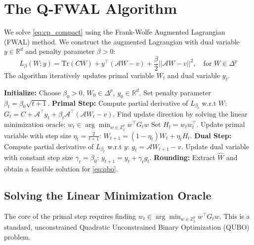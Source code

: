 \documentclass{article}
\begin{document}
\section{The Q-FWAL Algorithm}

We solve \eqref{eq:cp_compact} using the Frank-Wolfe Augmented Lagrangian (FWAL) method. We construct the augmented Lagrangian with dual variable $y \in \mathbb{R}^d$ and penalty parameter $\beta > 0$:
\begin{equation}
L_\beta(W; y) = \text{Tr}(CW) + y^\top (\mathcal{A}W - v) + \frac{\beta}{2} ||\mathcal{A}W - v||^2, \quad \text{for } W \in \Delta^p \label{eq:aug_lag}
\end{equation}
The algorithm iteratively updates primal variable $W_t$ and dual variable $y_t$.

\begin{algorithm}
\caption{Q-FWAL for Constrained QBO}
\begin{algorithmic}[1]
\State \textbf{Initialize:} Choose $\beta_0 > 0$, $W_0 \in \Delta^p$, $y_0 \in \mathbb{R}^d$.
    \State Set penalty parameter $\beta_t = \beta_0 \sqrt{t+1}$.
    \State \textbf{Primal Step:} Compute partial derivative of $L_{\beta_t}$ w.r.t $W$:
    \State \quad $G_t = C + \mathcal{A}^\top y_t + \beta_t \mathcal{A}^\top (\mathcal{A} W_t - v)$.
    \State \quad Find update direction by solving the linear minimization oracle:
    \State \quad \quad $w_t \in \arg\min_{w \in \mathbb{Z}_2^p} w^\top G_t w$
    \State \quad Set $H_t = w_t w_t^\top$.
    \State \quad Update primal variable with step size $\eta_t = \frac{2}{t+1}$:
    \State \quad \quad $W_{t+1} = (1 - \eta_t)W_t + \eta_t H_t$.
    \State \textbf{Dual Step:} Compute partial derivative of $L_{\beta_t}$ w.r.t $y$:
    \State \quad $g_t = \mathcal{A} W_{t+1} - v$.
    \State \quad Update dual variable with constant step size $\gamma_t = \beta_0$:
    \State \quad \quad $y_{t+1} = y_t + \gamma_t g_t$.
\EndFor
\State \textbf{Rounding:} Extract $\hat{W}$ and obtain a feasible solution for \eqref{eq:qbo}.
\end{algorithmic}
\end{algorithm}

\subsection{Solving the Linear Minimization Oracle}

The core of the primal step requires finding $w_t \in \arg\min_{w \in \mathbb{Z}_2^p} w^\top G_t w$. This is a standard, unconstrained Quadratic Unconstrained Binary Optimization (QUBO) problem.
\end{document}
